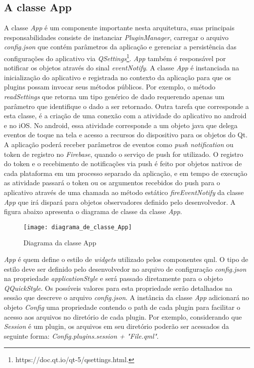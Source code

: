 \subsection{A classe App}\label{sec:solucao-desenvolvida}
A classe \textit{App} é um componente importante nesta arquitetura, suas principais responsabilidades consiste de instanciar \textit{PluginManager}, carregar o arquivo \textit{config.json} que contém parâmetros da aplicação e gerenciar a persistência das configurações do aplicativo via \textit{QSettings}\footnote{https://doc.qt.io/qt-5/qsettings.html.}. \textit{App} também é responsável por notificar os objetos através do sinal \textit{eventNotify}. A classe \textit{App} é instanciada na inicialização do aplicativo e registrada no contexto da aplicação para que os plugins possam invocar seus métodos públicos. Por exemplo, o método \textit{readSettings} que retorna um tipo genérico de dado requerendo apenas um parâmetro que identifique o dado a ser retornado. Outra tarefa que corresponde a esta classe, é a criação de uma conexão com a atividade do aplicativo no android e no iOS. No android, essa atividade corresponde a um objeto java que delega eventos de toque na tela e acesso a recursos do dispositivo para os objetos do Qt. A aplicação poderá receber parâmetros de eventos como \textit{push notification} ou token de registro no \textit{Firebase}, quando o serviço de push for utilizado. O registro do token e o recebimento de notificações via push é feito por objetos nativos de cada plataforma em um processo separado da aplicação, e em tempo de execução as atividade passará o token ou os argumentos recebidos do push para o aplicativo através de uma chamada ao método estático \textit{fireEventNotify} da classe \textit{App} que irá dispará para objetos observadores definido pelo desenvolvedor. A figura abaixo apresenta o diagrama de classe da classe \textit{App}.

\begin{figure}[H]
	\texttt{[image: diagrama\_de\_classe\_App]}
	\centering
	\caption{Diagrama da classe App}
\end{figure}

\textit{App} é quem define o estilo de \textit{widgets} utilizado pelos componentes qml. O tipo de estilo deve ser definido pelo desenvolvedor no arquivo de configuração \textit{config.json} na propriedade \textit{applicationStyle} e será passado diretamente para o objeto \textit{QQuickStyle}. Os possíveis valores para esta propriedade serão detalhados na sessão que descreve o arquivo \textit{config.json}. A instância da classe \textit{App} adicionará no objeto \textit{Config} uma propriedade contendo o path de cada plugin para facilitar o acesso aos arquivos no diretório de cada plugin. Por exemplo, considerando que \textit{Session} é um plugin, os arquivos em seu diretório poderão ser acessados da seguinte forma: \textit{Config.plugins.session + "File.qml"}.

